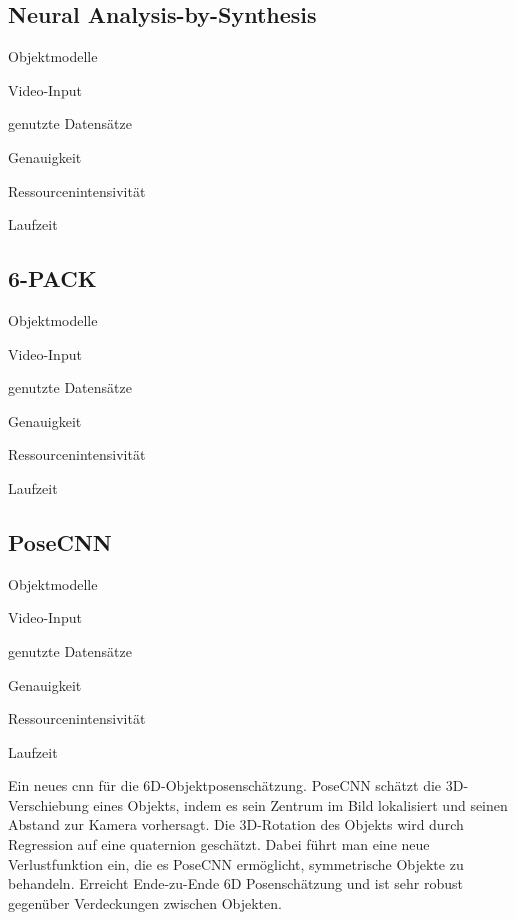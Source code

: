 \documentclass[a4paper, 11pt]{article}
\begin{document}
\begin{multicols*}{2}
    \subsection{Neural Analysis-by-Synthesis\cite{CategoryLevelObject}}
    \begin{description*}
        \item[Objektmodelle]
        \item[Video-Input]
        \item[genutzte Datensätze]
        \item[Genauigkeit]
        \item[Ressourcenintensivität]
        \item[Laufzeit]
    \end{description*}

    \subsection{6-PACK\cite{6pack}}
    \begin{description*}
        \item[Objektmodelle]
        \item[Video-Input]
        \item[genutzte Datensätze]
        \item[Genauigkeit]
        \item[Ressourcenintensivität]
        \item[Laufzeit]
    \end{description*}

    \subsection{PoseCNN\cite{PoseCNN}}
    \begin{description*}
        \item[Objektmodelle]
        \item[Video-Input]
        \item[genutzte Datensätze]
        \item[Genauigkeit]
        \item[Ressourcenintensivität]
        \item[Laufzeit]
    \end{description*}
    Ein neues \Gls{cnn} für die 6D-Objektposenschätzung. PoseCNN schätzt die 3D-Verschiebung eines Objekts, indem es sein Zentrum im Bild lokalisiert und seinen Abstand zur Kamera vorhersagt. Die 3D-Rotation des Objekts wird durch Regression auf eine \Gls{quaternion} geschätzt. Dabei führt man eine neue Verlustfunktion ein, die es PoseCNN ermöglicht, symmetrische Objekte zu behandeln. Erreicht Ende-zu-Ende 6D Posenschätzung und ist sehr robust gegenüber Verdeckungen zwischen Objekten.


\end{multicols*}
\end{document}
